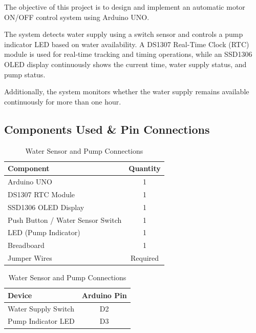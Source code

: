 The objective of this project is to design and implement an automatic motor ON/OFF control system using Arduino UNO.

The system detects water supply using a switch sensor and controls a pump indicator LED based on water availability. A DS1307 Real-Time Clock (RTC) module is used for real-time tracking and timing operations, while an SSD1306 OLED display continuously shows the current time, water supply status, and pump status.

Additionally, the system monitors whether the water supply remains available continuously for more than one hour.


\subsection{Components Used \& Pin Connections}

\begin{table}[H]
\centering

\begin{minipage}[t]{0.48\textwidth}
\centering
\caption{Motor ON/OFF System Components}
\label{tab:motor_components}

\begin{tabular}{|p{4cm}|c|}
\hline
\textbf{Component} & \textbf{Quantity} \\
\hline
Arduino UNO & 1 \\
DS1307 RTC Module & 1 \\
SSD1306 OLED Display & 1 \\
Push Button / Water Sensor Switch & 1 \\
LED (Pump Indicator) & 1 \\
Breadboard & 1 \\
Jumper Wires & Required \\
\hline
\end{tabular}

\end{minipage}
\hfill
\begin{minipage}[t]{0.47\textwidth}
\centering
\caption{Water Sensor and Pump Connections}
\label{tab:motor_pins}

\begin{tabular}{|l|c|}
\hline
\textbf{Device} & \textbf{Arduino Pin} \\
\hline
Water Supply Switch & D2 \\
Pump Indicator LED & D3 \\
\hline
\end{tabular}

\end{minipage}

\end{table}

